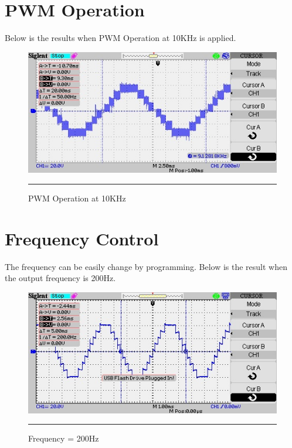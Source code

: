 \section{PWM Operation}
Below is the results when PWM Operation at 10KHz is applied.
\begin{figure}[htbp]
	\centering
	\includegraphics[width = 6in]{./Figures/Photos/Hardware/51}
	\rule{35em}{1pt}
	\caption{PWM Operation at 10KHz}
\end{figure}

\section{Frequency Control}
The frequency can be easily change by programming. Below is the result when the output frequency is 200Hz.
\begin{figure}[htbp]
	\centering
	\includegraphics[width = 6in]{./Figures/Photos/Hardware/31}
	\rule{35em}{1pt}
	\caption{Frequency = 200Hz}
\end{figure}

